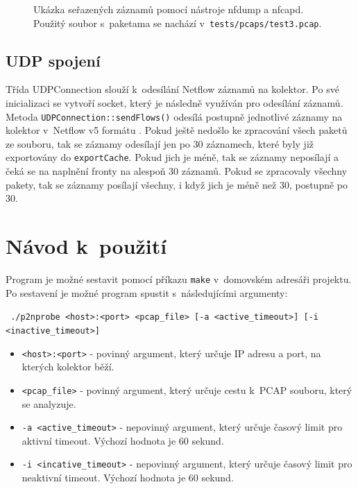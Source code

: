 \documentclass[a4paper, 11pt]{article}
\begin{document}
\begin{sloppypar}
\begin{figure}[!ht]
    \begin{center}
        \caption{Ukázka seřazených záznamů pomocí nástroje nfdump a nfcapd. Použitý soubor s~paketama se nachází v~\texttt{tests/pcaps/test3.pcap}.}
        \label{fig2}
    \end{center}
\end{figure}


\subsection{UDP spojení}
Třída UDPConnection slouží k~odesílání Netflow záznamů na kolektor. Po své inicializaci se vytvoří socket, který je následně využíván pro odesílání záznamů. Metoda \texttt{UDPConnection::sendFlows()} odesílá postupně jednotlivé záznamy na kolektor v~Netflow v5 formátu \cite{netflow5}. Pokud ještě nedošlo ke zpracování všech paketů ze souboru, tak se záznamy odesílají jen po 30 záznamech, které byly již exportovány do \verb|exportCache|. Pokud jich je méně, tak se záznamy neposílají a čeká se na naplnění fronty na alespoň 30 záznamů. Pokud se zpracovaly všechny pakety, tak se záznamy posílají všechny, i když jich je méně než 30, postupně po 30.

\section{Návod k~použití}

Program je možné sestavit pomocí příkazu \texttt{make} v~domovském adresáři projektu. Po sestavení je možné program spustit s~následujícími argumenty:

\vspace{0.1cm}
\texttt{
    ./p2nprobe <host>:<port> <pcap\_file> [-a <active\_timeout>] 
            [-i <inactive\_timeout>]
}

\begin{itemize}
    \item \texttt{<host>:<port>} - povinný argument, který určuje IP adresu a port, na kterých kolektor běží.
    \item \texttt{<pcap\_file>} - povinný argument, který určuje cestu k~PCAP souboru, který se analyzuje.
    \item \texttt{-a <active\_timeout>} - nepovinný argument, který určuje časový limit pro aktivní timeout. Výchozí hodnota je 60 sekund.
    \item \texttt{-i <incative\_timeout>} - nepovinný argument, který určuje časový limit pro neaktivní timeout. Výchozí hodnota je 60 sekund.
\end{itemize}


\end{sloppypar}
\end{document}
